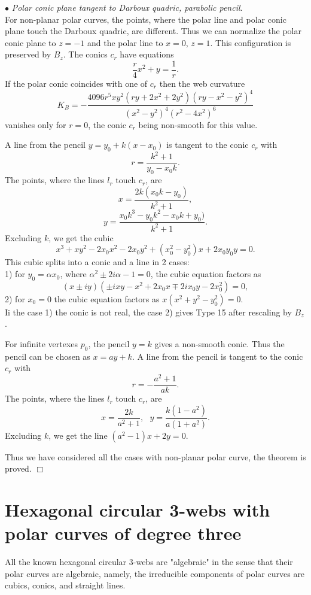 \documentclass[11pt,a4paper]{article}
\begin{document}
\smallskip

$\bullet${ \it Polar conic plane tangent to Darboux quadric, parabolic pencil}.\\ 
\smallskip
For non-planar polar curves, the points, where the polar line and polar conic plane touch the Darboux quadric, are different. Thus we can normalize the polar conic plane to $z=-1$ and the polar line to $x=0$, $z=1$. This configuration is preserved by $B_z$. The conics $c_r$ have equations 
$$
\frac{r}{4}x^2 + y =\frac{1}{r}.
$$
If the polar conic coincides with one of $c_r$ then the web curvature  
$$
K_B=-\frac{4096r^5xy^2(ry + 2x^2 + 2y^2)(ry - x^2 - y^2)^4}{(x^2 - y^2)^4(r^2 - 4x^2)^6}
$$
vanishes only for $r=0$, the conic $c_r$ being non-smooth for this value.

 A line from the pencil $y=y_0+k(x-x_0)$ is tangent to the conic $c_r$ with
$$
r=\frac{k^2+1}{y_0-x_0k}. 
$$ The points, where the lines $l_r$ touch $c_r$, are  
$$
x=\frac{2k(x_0k - y_0)}{k^2 + 1},$$
$$ 
y=\frac{x_0k^3 -y_0 k^2 -x_0 k + y_0)}{k^2 + 1}. 
$$ 
Excluding $k$, we get the cubic 
$$
x^3+ xy^2 - 2x_0x^2- 2x_0y^2   + (x_0^2 - y_0^2)x + 2x_0y_0y=0. 
$$
This cubic splits into a conic and a line in 2
 cases:\\ 
1) for $y_0=\alpha x_0$, where $\alpha ^2 \pm 2i \alpha -1=0$,  the cubic equation factors as 
$$
(x \pm i y)(\pm i xy -x^2 +2x_0x\mp 2 i x_0y   - 2x_0^2)=0,
$$ 
 2)  for  $x_0=0$ the cubic equation factors as $x(x^2+y^2-y_0^2)=0$.\\
 Ii the case 1) the conic is not real, the case 2) gives Type 15 after rescaling by $B_z$. 
 
 For infinite vertexes $p_0$, the pencil $y=k$ gives a non-smooth conic. Thus the pencil can be chosen as $x=ay+k$. A line from the pencil is tangent to the conic $c_r$ with
$$
r=-\frac{a^2+ 1}{ak}. 
$$ The points, where the lines $l_r$ touch $c_r$, are  
$$
x=\frac{2k}{a^2+1}, \ \ \ y=\frac{k(1- a^2 )}{a(1+a^2)}. 
$$ 
Excluding $k$, we get the line
$(a^2 - 1)x + 2y=0. $

\noindent Thus we have considered all the cases with non-planar polar curve, the theorem is proved. 
\hfill $\Box$\\


\section{Hexagonal circular 3-webs with  polar curves  of degree three}

All the known hexagonal circular 3-webs are "algebraic" in the sense that their  polar curves are algebraic, namely, the irreducible components  of polar curves are cubics, conics, and straight lines. 
\end{document}

